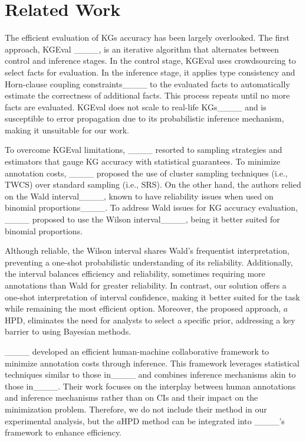 \section{Related Work}
\label{sec:relatedWork}

The efficient evaluation of \acp{KG} accuracy has been largely overlooked. The first approach, KGEval ____, is an iterative algorithm that alternates between control and inference stages. In the control stage, KGEval uses crowdsourcing to select facts for evaluation. In the inference stage, it applies type consistency and Horn-clause coupling constraints____ to the evaluated facts to automatically estimate the correctness of additional facts. This process repeats until no more facts are evaluated. KGEval does not scale to real-life \acp{KG}____ and is susceptible to error propagation due to its probabilistic inference mechanism, making it unsuitable for our work.

To overcome KGEval limitations, ____ resorted to sampling strategies and estimators that gauge \ac{KG} accuracy with statistical guarantees. To minimize annotation costs, ____ proposed the use of cluster sampling techniques (i.e., \ac{TWCS}) over standard sampling (i.e., \ac{SRS}). On the other hand, the authors relied on the Wald interval____, known to have reliability issues when used on binomial proportions____. To address Wald issues for \ac{KG} accuracy evaluation, ____ proposed to use the Wilson interval____, being it better suited for binomial proportions.

Although reliable, the Wilson interval shares Wald's frequentist interpretation, preventing a one-shot probabilistic understanding of its reliability. Additionally, the interval balances efficiency and reliability, sometimes requiring more annotations than Wald for greater reliability. In contrast, our solution offers a one-shot interpretation of interval confidence, making it better suited for the task while remaining the most efficient option. Moreover, the proposed approach, $a$HPD, eliminates the need for analysts to select a specific prior, addressing a key barrier to using Bayesian methods.

____ developed an efficient human-machine collaborative framework to minimize annotation costs through inference. This framework leverages statistical techniques similar to those in____ and combines inference mechanisms akin to those in____. Their work focuses on the interplay between human annotations and inference mechanisms rather than on \acp{CI} and their impact on the minimization problem. Therefore, we do not include their method in our experimental analysis, but the $a$HPD method can be integrated into ____'s framework to enhance efficiency.